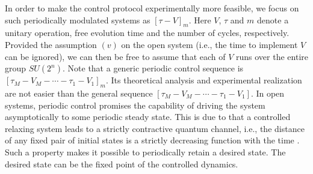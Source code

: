 \documentclass[prl,aps,twocolumn, reprint, amsmath,amssymb,showpacs,superscriptaddress]{revtex4}
\begin{document}
In order to make the control protocol experimentally more feasible, we focus on such periodically modulated systems as ${\left[{\tau } - {V} \right]_m}$. Here $V$, $\tau$ and $m$ denote a unitary operation, free evolution time and the number of cycles, respectively. Provided the assumption $(v)$ on the open system (i.e., the time to implement $V$ can be ignored),  we can then be free to assume that each of $V$ runs over the entire group $SU(2^n)$. Note that a generic periodic control sequence is ${\left[ {\tau _M} - {{V_M} - \cdots -{\tau _1}} - {V_1} \right]_m}$. Its theoretical analysis and experimental realization are not easier than the general sequence $ [ {\tau _M} - {{V_M} - \cdots -{\tau _1}} - {V_1} ]$. In open systems, periodic control promises the capability of  driving the system asymptotically to some periodic steady state. This is due to that a controlled relaxing system leads to a strictly contractive quantum channel, i.e., the distance of any fixed pair of initial states is a strictly decreasing function with the time \cite{RH}. Such a property makes it possible to periodically retain a desired state. The desired state can be the fixed point of the controlled dynamics.
\end{document}
